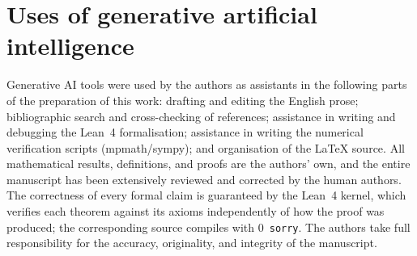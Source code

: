 \section*{Uses of generative artificial intelligence}

Generative AI tools were used by the authors as assistants in the
following parts of the preparation of this work: drafting and editing
the English prose; bibliographic search and cross-checking of
references; assistance in writing and debugging the Lean~4
formalisation; assistance in writing the numerical verification
scripts (mpmath/sympy); and organisation of the \LaTeX{} source.  All
mathematical results, definitions, and proofs are the authors' own,
and the entire manuscript has been extensively reviewed and corrected
by the human authors.  The correctness of every formal claim is
guaranteed by the Lean~4 kernel, which verifies each theorem against
its axioms independently of how the proof was produced; the
corresponding source compiles with $0$~\texttt{sorry}.  The authors
take full responsibility for the accuracy, originality, and integrity
of the manuscript.

